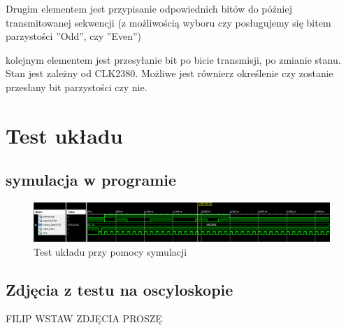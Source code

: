 Drugim elementem jest przypisanie odpowiednich bitów do później transmitowanej sekwencji (z możliwością wyboru czy posługujemy się bitem parzystości ''Odd'', czy ''Even'')


kolejnym elementem jest przesyłanie bit po bicie transmisji, po zmianie stanu. Stan jest zależny od CLK2380. Możliwe jest równierz określenie czy zostanie przesłany bit parzystości czy nie.


\section{Test układu}
\subsection{symulacja w programie}

\begin{figure}[!htb]
    \centering
    \includegraphics[width=18cm]{./Images/Symulacja.png}
    \caption*{Test układu przy pomocy symulacji}
\end{figure}
\clearpage

\subsection{Zdjęcia z testu na oscyloskopie}
FILIP WSTAW ZDJĘCIA PROSZĘ